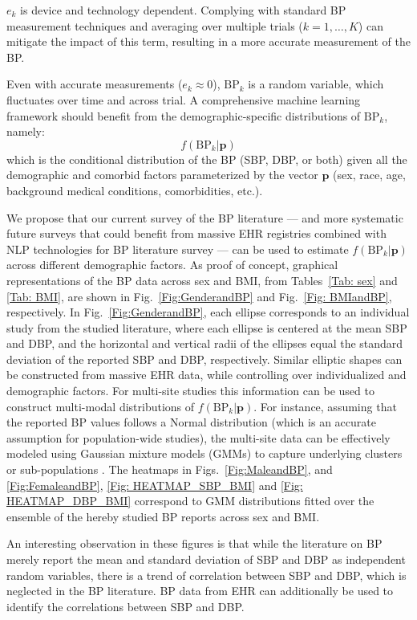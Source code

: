 \documentclass[journal,article,moreauthors]{Definitions/mdpi}
\begin{document}
$e_k$ is device and technology dependent. Complying with standard BP measurement techniques and averaging over multiple trials ($k=1, \ldots, K$) can mitigate the impact of this term, resulting in a more accurate measurement of the BP.

Even with accurate measurements ($e_k\approx 0$), $\text{BP}_k$ is a random variable, which fluctuates over time and across trial. A comprehensive machine learning framework should benefit from the demographic-specific distributions of $\text{BP}_k$, namely:
\begin{equation}
    f(\text{BP}_k|\mathbf{p})
\end{equation}
which is the conditional distribution of the BP (SBP, DBP, or both) given all the demographic and comorbid factors parameterized by the vector $\mathbf{p}$ (sex, race, age, background medical conditions, comorbidities, etc.).

We propose that our current survey of the BP literature --- and more systematic future surveys that could benefit from massive EHR registries combined with NLP technologies for BP literature survey --- can be used to estimate $f(\text{BP}_k|\mathbf{p})$ across different demographic factors. As proof of concept, graphical representations of the BP data across sex and BMI, from Tables~\ref{Tab: sex} and \ref{Tab: BMI}, are shown in Fig.~\ref{Fig:GenderandBP} and Fig.~\ref{Fig: BMIandBP}, respectively. In Fig.~\ref{Fig:GenderandBP}, each ellipse corresponds to an individual study from the studied literature, where each ellipse is centered at the mean SBP and DBP, and the horizontal and vertical radii of the ellipses equal the standard deviation of the reported SBP and DBP, respectively. Similar elliptic shapes can be constructed from massive EHR data, while controlling over individualized and demographic factors. For multi-site studies this information can be used to construct multi-modal distributions of $f(\text{BP}_k|\mathbf{p})$. For instance, assuming that the reported BP values follows a Normal distribution (which is an accurate assumption for population-wide studies), the multi-site data can be effectively modeled using Gaussian mixture models (GMMs) to capture underlying clusters or sub-populations \citep{reynolds2009gaussian}. The heatmaps in Figs.~\ref{Fig:MaleandBP}, and \ref{Fig:FemaleandBP}, \ref{Fig: HEATMAP_SBP_BMI} and \ref{Fig: HEATMAP_DBP_BMI} correspond to GMM distributions fitted over the ensemble of the hereby studied BP reports across sex and BMI.

An interesting observation in these figures is that while the literature on BP merely report the mean and standard deviation of SBP and DBP as independent random variables, there is a trend of correlation between SBP and DBP, which is neglected in the BP literature. BP data from EHR can additionally be used to identify the correlations between SBP and DBP.
\end{document}
